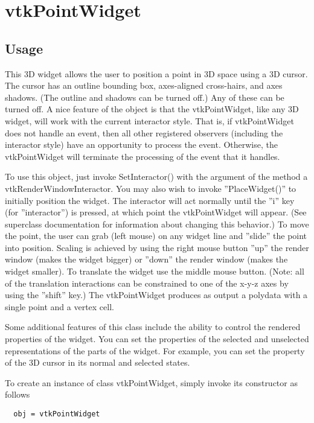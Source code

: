 \section{vtkPointWidget}

\subsection{Usage}

 This 3D widget allows the user to position a point in 3D space using a 3D
 cursor. The cursor has an outline bounding box, axes-aligned cross-hairs,
 and axes shadows. (The outline and shadows can be turned off.) Any of
 these can be turned off. A nice feature of the object is that the
 vtkPointWidget, like any 3D widget, will work with the current interactor
 style. That is, if vtkPointWidget does not handle an event, then all other
 registered observers (including the interactor style) have an opportunity
 to process the event. Otherwise, the vtkPointWidget will terminate the
 processing of the event that it handles.

 To use this object, just invoke SetInteractor() with the argument of the
 method a vtkRenderWindowInteractor.  You may also wish to invoke
 ''PlaceWidget()'' to initially position the widget. The interactor will act
 normally until the ''i'' key (for ''interactor'') is pressed, at which point
 the vtkPointWidget will appear. (See superclass documentation for
 information about changing this behavior.) To move the point, the user can
 grab (left mouse) on any widget line and ''slide'' the point into
 position. Scaling is achieved by using the right mouse button ''up'' the
 render window (makes the widget bigger) or ''down'' the render window (makes
 the widget smaller). To translate the widget use the middle mouse button.
 (Note: all of the translation interactions can be constrained to one of
 the x-y-z axes by using the ''shift'' key.) The vtkPointWidget produces as
 output a polydata with a single point and a vertex cell.

 Some additional features of this class include the ability to control the
 rendered properties of the widget. You can set the properties of the
 selected and unselected representations of the parts of the widget. For
 example, you can set the property of the 3D cursor in its normal and
 selected states.

To create an instance of class vtkPointWidget, simply
invoke its constructor as follows
\begin{verbatim}
  obj = vtkPointWidget
\end{verbatim}

